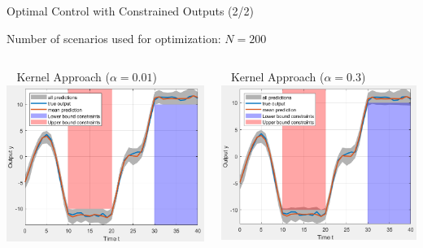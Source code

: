 \documentclass[student, noshadow, itr, english, aspectratio=169]{ITR_LSR_slides}
\begin{document}
\begin{frame}{Optimal Control with Constrained Outputs (2/2)}

Number of scenarios used for optimization: $N = 200$
\vspace{.3cm}
\begin{columns}[onlytextwidth, T]
		\begin{column}{.5\textwidth}
			$\;\;$ Kernel Approach  ($\alpha = 0.01$)
			\includegraphics[width= .9\textwidth]{Kernel_plot_alpha001}
		\end{column}
		\begin{column}{.5\textwidth}
			$\;\;$ Kernel Approach  ($\alpha = 0.3$)
			\includegraphics[width=.9\textwidth]{Kernel_plot_alpha03}
		\end{column}
	\end{columns}\vspace{.5cm}
\end{frame}	
\end{document}
